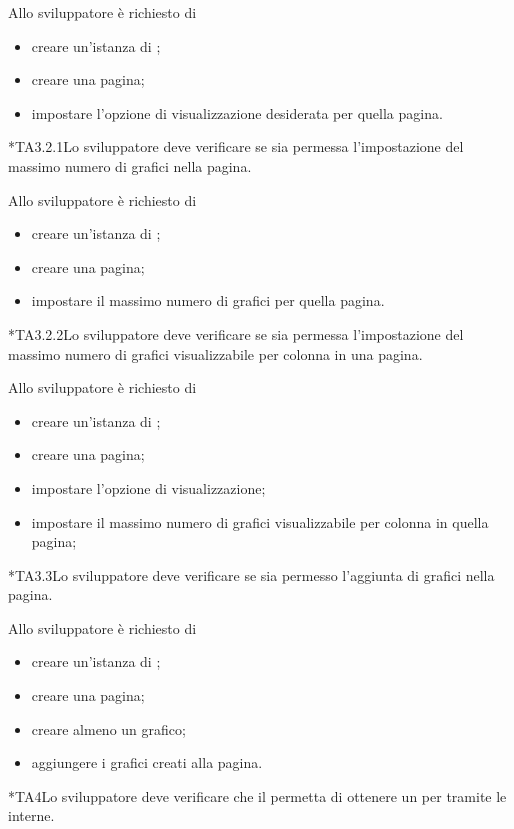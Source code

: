 		Allo sviluppatore è richiesto di
		\begin{itemize}
			\item creare un'istanza di \projectname{};
			\item creare una pagina;
			\item impostare l'opzione di visualizzazione desiderata per quella pagina.
		\end{itemize}

	*{TA3.2.1}Lo sviluppatore deve verificare se sia permessa l'impostazione del massimo numero di grafici nella pagina.
		
		Allo sviluppatore è richiesto di
		\begin{itemize}
			\item creare un'istanza di \projectname{};
			\item creare una pagina;
			\item impostare il massimo numero di grafici per quella pagina.
		\end{itemize}

	*{TA3.2.2}Lo sviluppatore deve verificare se sia permessa l'impostazione del massimo numero di grafici visualizzabile per colonna in una pagina.
		
		Allo sviluppatore è richiesto di
		\begin{itemize}
			\item creare un'istanza di \projectname{};
			\item creare una pagina;
			\item impostare l'opzione di visualizzazione;
			\item impostare il massimo numero di grafici visualizzabile per colonna in quella pagina;
		\end{itemize}

	*{TA3.3}Lo sviluppatore deve verificare se sia permesso l'aggiunta di grafici nella pagina.
		
		Allo sviluppatore è richiesto di
		\begin{itemize}
			\item creare un'istanza di \projectname{};
			\item creare una pagina;
			\item creare almeno un grafico;
			\item aggiungere i grafici creati alla pagina.
		\end{itemize}

	*{TA4}Lo sviluppatore deve verificare che il  permetta di ottenere un  per  tramite le  interne.
		

